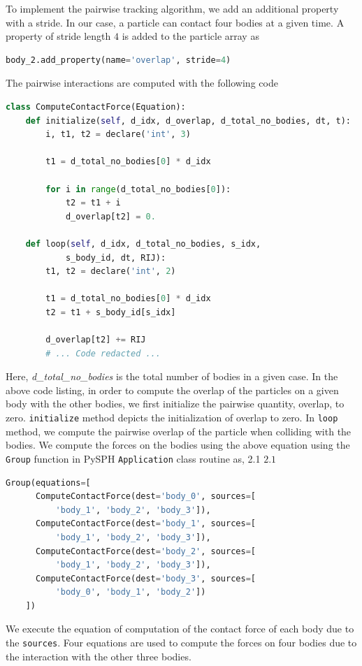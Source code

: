 To implement the pairwise tracking algorithm, we add an additional property with
a stride. In our case, a particle can contact four bodies at a given time. A
property of stride length $4$ is added to the particle array as
 \lstset{basicstyle=\footnotesize\ttfamily}
\begin{lstlisting}[label={contact:equations},frame=lines,language=Python,upquote=True]
body_2.add_property(name='overlap', stride=4)
\end{lstlisting}
The pairwise interactions are computed with the following code
 \lstset{basicstyle=\footnotesize\ttfamily}
\begin{lstlisting}[label={contact:equations},frame=lines,language=Python,upquote=True]
class ComputeContactForce(Equation):
    def initialize(self, d_idx, d_overlap, d_total_no_bodies, dt, t):
        i, t1, t2 = declare('int', 3)

        t1 = d_total_no_bodies[0] * d_idx

        for i in range(d_total_no_bodies[0]):
            t2 = t1 + i
            d_overlap[t2] = 0.

    def loop(self, d_idx, d_total_no_bodies, s_idx,
            s_body_id, dt, RIJ):
        t1, t2 = declare('int', 2)

        t1 = d_total_no_bodies[0] * d_idx
        t2 = t1 + s_body_id[s_idx]

        d_overlap[t2] += RIJ
        # ... Code redacted ...
\end{lstlisting}
Here, \textit{d\_total\_no\_bodies} is the total number of bodies in a given
case. In the above code listing, in order to compute the overlap of the
particles on a given body with the other bodies, we first initialize the
pairwise quantity, overlap, to zero. \texttt{initialize} method depicts the
initialization of overlap to zero. In \texttt{loop} method, we compute the pairwise
overlap of the particle when colliding with the bodies. We compute the forces on
the bodies using the above equation using the \texttt{Group} function in PySPH
\texttt{Application} class routine as, 2.1 $2.1$
 \lstset{basicstyle=\footnotesize\ttfamily}
\begin{lstlisting}[label={contact:equations},frame=lines,language=Python,upquote=True]
  Group(equations=[
      ComputeContactForce(dest='body_0', sources=[
          'body_1', 'body_2', 'body_3']),
      ComputeContactForce(dest='body_1', sources=[
          'body_1', 'body_2', 'body_3']),
      ComputeContactForce(dest='body_2', sources=[
          'body_1', 'body_2', 'body_3']),
      ComputeContactForce(dest='body_3', sources=[
          'body_0', 'body_1', 'body_2'])
    ])
\end{lstlisting}
We execute the equation of computation of the contact force of each body due to the
\texttt{sources}. Four equations are used to compute the forces on four bodies due to
the interaction with the other three bodies.


